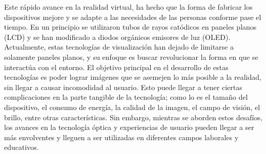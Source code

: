 Este rápido avance en la realidad virtual, ha hecho que la forma de fabricar los dispositivos mejore y se adapte a las necesidades de las personas conforme pase el tiempo. En un principio se utilizaron tubos de rayos catódicos en paneles planos (LCD) y se han modificado a diodos orgánicos emisores de luz (OLED). Actualmente, estas tecnologías de visualización han dejado de limitarse a solamente paneles planos, y su enfoque es buscar revolucionar la forma en que se interactúa con el entorno. El objetivo principal en el desarrollo de estas tecnologías es poder lograr imágenes que se asemejen lo más posible a la realidad, sin llegar a causar incomodidad al usuario. Esto puede llegar a tener ciertas complicaciones en la parte tangible de la tecnología; como lo es el tamaño del dispositivo, el consumo de energía, la calidad de la imagen, el campo de visión, el brillo, entre otras características. Sin embargo, mientras se aborden estos desafíos, los avances en la tecnología óptica y experiencias de usuario pueden llegar a ser más envolventes y lleguen a ser utilizadas en diferentes campos laborales y educativos. \cite{zhan2020augmented}
